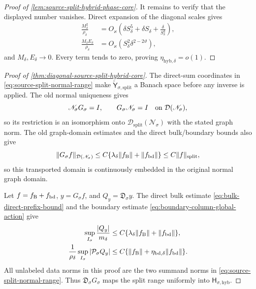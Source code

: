 \begin{proof}[Proof of
\cref{lem:source-split-hybrid-phase-core}]
It remains to verify that the displayed number vanishes.  Direct expansion
of the diagonal scales gives
\begin{align*}
 \frac{M_\delta^2}{\rho_\delta}
 &=O_\varkappa\left(
    \delta S_\delta^5+\delta S_\delta
       +\frac{\delta}{S_\delta^3}\right),\\
 \frac{M_\delta E_\delta}{\rho_\delta}
 &=O_\varkappa(S_\delta^2\delta^{2-2\vartheta}),
\end{align*}
and \(M_\delta,E_\delta\to0\).  Every term tends to zero, proving
\(\eta_{\mathrm{hyb},\delta}=o(1)\).
\end{proof}

\begin{proof}[Proof of
\cref{thm:diagonal-source-split-hybrid-core}]
The direct-sum coordinates in
\cref{eq:source-split-normal-range} make
\(\widetilde{\mathsf Y}_{\sigma,\mathrm{split}}\) a Banach space before
any inverse is applied.  The old normal uniqueness gives
\begin{equation*}
 \mathscr N_\sigma G_\sigma=I,
 \qquad G_\sigma\mathscr N_\sigma=I
 \quad\hbox{on }\mathcal D(\mathscr N_\sigma),
\end{equation*}
so its restriction is an isomorphism onto
\(\mathcal D_{\mathrm{split}}(\mathscr N_\sigma)\) with the stated graph
norm.
The old graph-domain estimates and the direct bulk/boundary bounds also give
\begin{equation}
 \|G_\sigma f\|_{\mathcal D(\mathscr N_\sigma)}
 \le C\{\lambda_\delta\|f_{\rm B}\|+\|f_{\rm bd}\|\}
 \le C\|f\|_{\mathrm{split}},                   \label{eq:proof-source-split-old-graph-embedding}
\end{equation}
so this transported domain is continuously embedded in the original normal
graph domain.

Let \(f=f_{\rm B}+f_{\rm bd}\), \(y=G_\sigma f\), and
\(Q_y=\mathfrak D_\sigma y\).  The direct bulk estimate
\cref{eq:bulk-direct-prefix-bound} and the boundary estimate
\cref{eq:boundary-column-global-action} give
\begin{align}
 \sup_{I_\sigma}\frac{|Q_y|}{m_\delta}
 &\le C\{\lambda_\delta\|f_{\rm B}\|
                  +\|f_{\rm bd}\|\},\notag\\
 \frac1{\rho_\delta}\sup_{I_\sigma}
       |\mathcal P_\sigma Q_y|
 &\le C\{\|f_{\rm B}\|
           +\eta_{{\rm bd},\delta}\|f_{\rm bd}\|\}.       \label{eq:proof-source-split-normal-action}
\end{align}
All unlabeled data norms in this proof are the two summand norms in
\cref{eq:source-split-normal-range}.  Thus
\(\mathfrak D_\sigma G_\sigma\) maps the split range uniformly into
\(\mathsf H_{\sigma,\mathrm{hyb}}\).


\end{proof}
